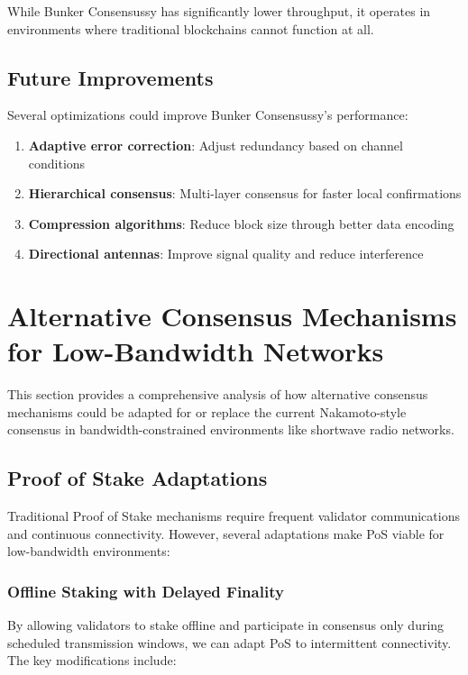 \documentclass[11pt,a4paper]{article}
\begin{document}
While Bunker Consensussy has significantly lower throughput, it operates in environments where traditional blockchains cannot function at all.

\subsection{Future Improvements}

Several optimizations could improve Bunker Consensussy's performance:

\begin{enumerate}
\item \textbf{Adaptive error correction}: Adjust redundancy based on channel conditions
\item \textbf{Hierarchical consensus}: Multi-layer consensus for faster local confirmations
\item \textbf{Compression algorithms}: Reduce block size through better data encoding
\item \textbf{Directional antennas}: Improve signal quality and reduce interference
\end{enumerate}

\section{Alternative Consensus Mechanisms for Low-Bandwidth Networks}

This section provides a comprehensive analysis of how alternative consensus mechanisms could be adapted for or replace the current Nakamoto-style consensus in bandwidth-constrained environments like shortwave radio networks.

\subsection{Proof of Stake Adaptations}

Traditional Proof of Stake mechanisms require frequent validator communications and continuous connectivity. However, several adaptations make PoS viable for low-bandwidth environments:

\subsubsection{Offline Staking with Delayed Finality}

By allowing validators to stake offline and participate in consensus only during scheduled transmission windows, we can adapt PoS to intermittent connectivity. The key modifications include:
\end{document}
